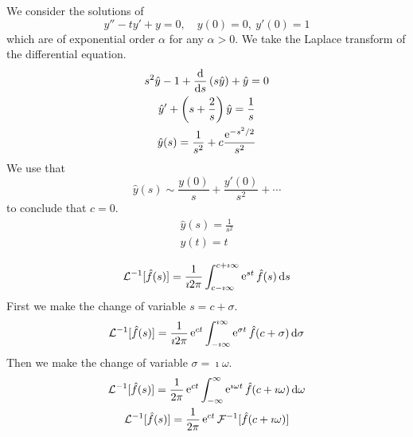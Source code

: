 {\begin{Solution}
\end{Solution}















\begin{Solution}
  \label{solution y''-ty'+y=0}
  We consider the solutions of
  \[
  y'' - t y' + y = 0, \quad y(0) = 0,\ y'(0) = 1
  \]
  which are of exponential order $\alpha$ for any $\alpha > 0$.
  We take the Laplace transform of the differential equation.
  \begin{gather*}
    s^2 \hat{y} - 1 + \frac{\mathrm{d}}{\mathrm{d} s} \left( s \hat{y} \right) + \hat{y} = 0 \\
    \hat{y}' + \left( s + \frac{2}{s} \right) \hat{y} = \frac{1}{s} \\
    \hat{y}(s) = \frac{1}{s^2} + c \frac{\mathop{\mathrm{e}}\nolimits^{-s^2/2}}{s^2}
  \end{gather*}
  We use that
  \[
  \hat{y}(s) \sim \frac{y(0)}{s} + \frac{y'(0)}{s^2} + \cdots
  \]
  to conclude that $c = 0$.
  \begin{gather*}
    \hat{y}(s) = \frac{1}{s^2} \\
    \boxed{
      y(t) = t
      }
  \end{gather*}
\end{Solution}










\begin{Solution}
  \label{solution relation Laplace Fourier}
  \[
  \mathcal{L}^{-1}[\hat{f}(s)] = \frac{1}{\imath 2 \pi} \int_{c - \imath \infty}^{c + \imath \infty}
  \mathop{\mathrm{e}}\nolimits^{s t} \hat{f}(s) \,\mathrm{d} s
  \]
  First we make the change of variable $s = c + \sigma$.
  \[
  \mathcal{L}^{-1}[\hat{f}(s)] = \frac{1}{\imath 2 \pi} \mathop{\mathrm{e}}\nolimits^{c t}\int_{- \imath \infty}^{\imath \infty}
  \mathop{\mathrm{e}}\nolimits^{\sigma t} \hat{f}(c + \sigma) \,\mathrm{d} \sigma
  \]
  Then we make the change of variable $\sigma = \imath \omega$.
  \begin{gather*}
    \mathcal{L}^{-1}[\hat{f}(s)] = \frac{1}{2\pi} \mathop{\mathrm{e}}\nolimits^{c t}\int_{- \infty}^{\infty}
    \mathop{\mathrm{e}}\nolimits^{\imath \omega t} \hat{f}(c + \imath \omega) \,\mathrm{d} \omega \\
    \mathcal{L}^{-1}[\hat{f}(s)] = \frac{1}{2\pi} \mathop{\mathrm{e}}\nolimits^{c t} \mathcal{F}^{-1}
    [\hat{f}(c + \imath \omega)]
  \end{gather*}
\end{Solution}









}
